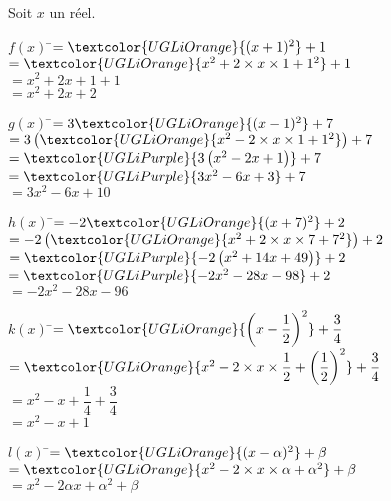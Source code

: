 \documentclass[a4paper,11pt,exos]{nsi} %
\begin{document}
Soit $x$ un réel.
\begin{multicols}{2}
        \begin{tabbing}
        $f(x)$  \=$=\textcolor{UGLiOrange}{(x+1)^2}+1$\\
        \>  $=\textcolor{UGLiOrange}{x^2+2\times x\times 1+1^2}+1$\\
        \>  $=x^2+2x+1+1$\\
        \>  $=x^2+2x+2$
    \end{tabbing}

    \vfill\null \columnbreak

    \begin{tabbing}
        $g(x)$  \=$=3\textcolor{UGLiOrange}{(x-1)^2}+7$\\
        \>  $=3\left(\textcolor{UGLiOrange}{x^2-2\times x\times 1+1^2}\right)+7$\\
        \>  $=\textcolor{UGLiPurple}{3\left(x^2-2x+1\right)}+7$\\
        \>  $=\textcolor{UGLiPurple}{3x^2-6x+3}+7$\\
        \>  $=3x^2-6x+10$
    \end{tabbing}

    \newpage

    \begin{tabbing}
        $h(x)$  \=$=-2\textcolor{UGLiOrange}{(x+7)^2}+2$\\
        \>  $=-2\left(\textcolor{UGLiOrange}{x^2+2\times x\times 7+7^2}\right)+2$\\
        \>  $=\textcolor{UGLiPurple}{-2\left(x^2+14x+49\right)}+2$\\
        \>  $=\textcolor{UGLiPurple}{-2x^2-28x-98}+2$\\
        \>  $=-2x^2-28x-96$
    \end{tabbing}

    \vfill\null\columnbreak
    \begin{tabbing}
        $k(x)$  \=$=\textcolor{UGLiOrange}{\left(x-\dfrac{1}{2}\right)^2}+\dfrac{3}{4}$\\
        \>  $=\textcolor{UGLiOrange}{x^2-2\times x\times \dfrac{1}{2}+\left(\dfrac{1}{2}\right)^2}+\dfrac{3}{4}$\\%
        \>  $=x^2-x+\dfrac{1}{4}+\dfrac{3}{4}$\\%
        \>  $=x^2-x+1$
    \end{tabbing}

    

    \begin{tabbing}
        $l(x)$  \=$=\textcolor{UGLiOrange}{(x-\alpha)^2}+\beta$\\
        \>  $=\textcolor{UGLiOrange}{x^2-2\times x\times \alpha+\alpha^2}+\beta$\\
        \>  $=x^2-2\alpha x+\alpha^2+\beta$
    \end{tabbing}
\end{multicols}
\end{document}

